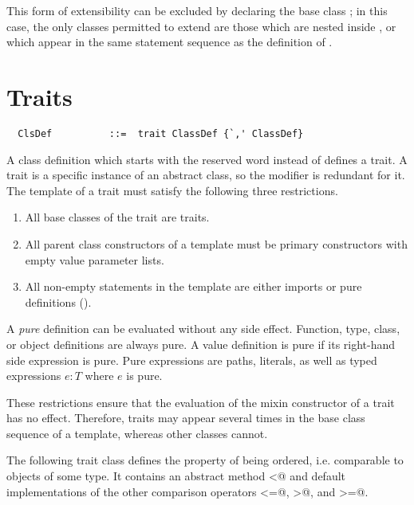 \documentclass[a4paper,12pt,twoside,titlepage]{book}
\begin{document}
This form of extensibility can be excluded by declaring the base class
 ; in this case, the only classes permitted to
extend  are those which are nested inside , or
which appear in the same statement sequence as the definition of
.

\section{Traits}

\label{sec:traits}

\syntax\begin{lstlisting}
  ClsDef          ::=  trait ClassDef {`,' ClassDef}
\end{lstlisting}

A class definition which starts with the reserved word 
instead of  defines a trait. A trait is a specific
instance of an abstract class, so the  modifier is
redundant for it.  The template of a trait must satisfy the following
three restrictions.
\begin{enumerate}
\item All base classes of the trait are traits.
\item All parent class constructors of a template
      must be primary constructors with empty value
      parameter lists. 
\item All non-empty statements in the template are either imports or pure definitions ().
\end{enumerate}
A {\em pure} definition can be evaluated without any side effect.
Function, type, class, or object definitions are always pure. A value
definition is pure if its right-hand side expression is pure. Pure
expressions are paths, literals, as well as typed expressions
$e: T$ where $e$ is pure.

These restrictions ensure that the evaluation of the mixin constructor
of a trait has no effect. Therefore, traits may appear several times 
in the base class sequence of a template, whereas other classes cannot.

\example\label{ex:comparable}
The following trait class defines the property of being
ordered, i.e. comparable to objects of some type. It contains an abstract method
\lstinline@<@ and default implementations of the other comparison operators
\lstinline@<=@, \lstinline@>@, and \lstinline@>=@.
\end{document}

